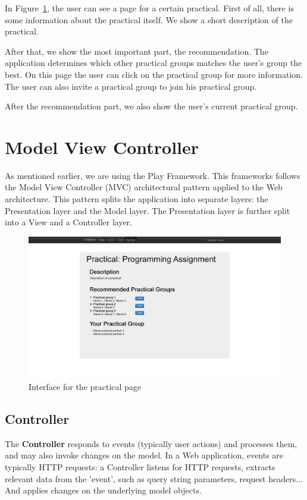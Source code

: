In Figure~\ref{mockup_practical}, the user can see a page for a certain practical.
First of all, there is some information about the practical itself.
We show a short description of the practical.

After that, we show the most important part, the recommendation.
The application determines which other practical groups matches the user's group the best.
On this page the user can click on the practical group for more information.
The user can also invite a practical group to join his practical group.

After the recommendation part, we also show the user's current practical group.

\section{Model View Controller}
\label{sec:mvc}
As mentioned earlier, we are using the Play Framework. 
This frameworks follows the Model View Controller (MVC) architectural pattern applied to the Web architecture\cite{playframework_mvc}.
This pattern splits the application into separate layers: the Presentation layer and the Model layer. 
The Presentation layer is further split into a View and a Controller layer.

\begin{figure}[H]
    \centering
    \captionsetup{justification=centering}
    \includegraphics[width=\textwidth, frame]{images/mockup_practical}
    \caption{Interface for the practical page}
    \label{mockup_practical}
\end{figure}

\subsection{Controller}
The \textbf{Controller} responds to events (typically user actions) and processes them, and may also invoke changes on the model.
In a Web application, events are typically HTTP requests: a Controller listens for HTTP requests, extracts relevant data from the 'event', such as query string parameters, request headers... 
And applies changes on the underlying model objects.

